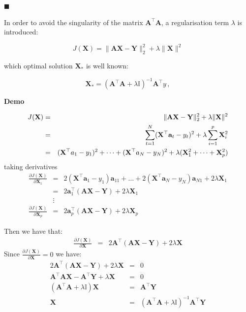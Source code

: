 $\blacksquare$


In order to avoid the singularity of the matrix $\mathbf{A}^\top \mathbf{A}$, a regularisation term $\lambda$ is introduced: 

\begin{equation}
\label{eq:RRproblem} 
J(\mathbf{\mathbf{X}}) =  \| \mathbf{A}\mathbf{\mathbf{X}} - \mathbf{Y} \|_2^2  + \lambda
 \| \mathbf{\mathbf{X}}\| ^2
\end{equation}

\noindent which optimal solution $\mathbf{\mathbf{X}}_*$ is well known: 

\begin{equation*}
\label{eq:optsolRR}
\mathbf{\mathbf{X}}_*=(\mathbf{A}^\top \mathbf{A}+\lambda \mathbb{I})^{-1}\mathbf{A}^\top y \, ,
\end{equation*}

\textbf{Demo}\quad

\begin{eqnarray*}
J(\mathbf{\mathbf{X}}) &=&  \| \mathbf{A}\mathbf{\mathbf{X}} - \mathbf{Y} \|_2^2  + \lambda
 \| \mathbf{\mathbf{X}}\| ^2 \\
 &=&  \sum_{t=1}^N (\mathbf{\mathbf{X}}^\top {\bf a}_t-y_t)^2 + \lambda \sum_{i=1}^p \mathbf{X}_i^2 \\
 &=& (\mathbf{X}^\top a_1-y_1)^2 + \dots + (\mathbf{X}^\top a_N-y_N)^2 + \lambda (\mathbf{X}_1^2+\dots+\mathbf{X}_p^2)
\end{eqnarray*}
\noindent taking derivatives
 \begin{eqnarray*}
 \frac{\partial J(\mathbf{\mathbf{X}})}{\partial \mathbf{X}_1}&=& 
 2(\mathbf{X}^\top \mathbf{a}_1-y_1)\mathbf{a}_{11} + \dots + 2(\mathbf{X}^\top \mathbf{a}_N-y_N)\mathbf{a}_{N1} + 2\lambda \mathbf{X}_1 \\
 &=& 2\mathbf{a}_1^\top(\mathbf{A}\mathbf{X}-\mathbf{Y}) + 2\lambda\mathbf{X}_1\\
& \vdots &\\
  \frac{\partial J(\mathbf{\mathbf{X}})}{\partial \mathbf{X}_p}&=& 
 2\mathbf{a}_p^\top(\mathbf{A}\mathbf{X}-\mathbf{Y}) + 2\lambda\mathbf{X}_p 
\end{eqnarray*}

Then we have that:
\begin{eqnarray*}
\frac{\partial J(\mathbf{\mathbf{X}})}{\partial \mathbf{X}}&=& 
 2\mathbf{A}^\top(\mathbf{A}\mathbf{X}-\mathbf{Y}) + 2\lambda\mathbf{X}
\end{eqnarray*}
Since $\frac{\partial J(\mathbf{\mathbf{X}})}{\partial \mathbf{X}}=0$ we have:
\begin{eqnarray*}
2\mathbf{A}^\top(\mathbf{A}\mathbf{X}-\mathbf{Y}) + 2\lambda\mathbf{X}&=&0 \\
\mathbf{A}^\top\mathbf{A}\mathbf{X} - \mathbf{A}^\top\mathbf{Y} + \lambda\mathbf{X} &=& 0\\
(\mathbf{A}^\top\mathbf{A}+\lambda\mathbb{I})\mathbf{X} &=&  \mathbf{A}^\top\mathbf{Y} \\
\mathbf{X} &=& (\mathbf{A}^\top\mathbf{A}+\lambda\mathbb{I})^{-1}  \mathbf{A}^\top\mathbf{Y}
\end{eqnarray*}

